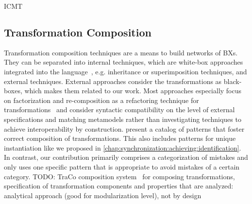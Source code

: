 \begin{copiedFrom}{ICMT}
\subsection*{Transformation Composition}
Transformation composition techniques are a means to build networks of \acp{BX}.
They can be separated into internal techniques, which are white-box approaches integrated into the language~\cite{wagelaar2008a, wagelaar2010a, wagelaar2011a}, e.g. inheritance or superimposition techniques, and external techniques.
External approaches consider the transformations as black-boxes, which makes them related to our work.
Most approaches especially focus on factorization and re-composition as a refactoring technique for transformations~\cite{cuadrado2008a} and consider syntactic compatibility on the level of external specifications and matching metamodels rather than investigating techniques to achieve interoperability by construction.
\textcite{lano2014a} present a catalog of patterns that foster correct composition of transformations.
This also includes patterns for unique instantiation like we proposed in \autoref{chap:synchronization:achieving:identification}.
In contrast, our contribution primarily comprises a categorization of mistakes %
and only uses one specific pattern that is appropriate to avoid mistakes of a certain category. %
TODO: TraCo composition system~\cite{heidenreich2010composition} for composing transformations, specification of transformation components and properties that are analyzed: analytical approach (good for modularization level), not by design




\end{copiedFrom}
